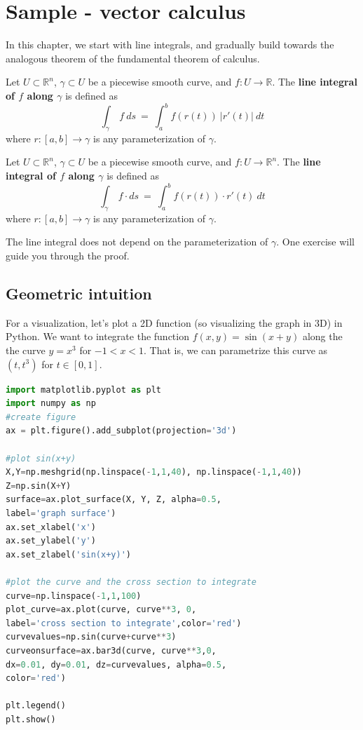 \documentclass[11pt,openany]{book}
\newcommand{\definition}[2]{\begin{tcolorbox}[title=Definition ({#1}),colframe=black]{#2}\end{tcolorbox}
}
\begin{document}
	
	\chapter{Sample - vector calculus}
	
	
	In this chapter, we start with line integrals, and gradually build towards the analogous theorem of the fundamental theorem of calculus.
	
	\definition{Line Integral - scalar}{
		Let $U \subset \mathbb{R}^n$, $\gamma \subset U$ be a piecewise smooth curve, and $f: U \to \mathbb{R}$. The \textbf{line integral of $f$ along $\gamma$} is defined as
		\[
		\int_\gamma \ f \ ds \ = \ \int_a^b f(r(t)) \ |r'(t)| \ dt
		\]
		where $r : [a,b] \to \gamma$ is any parameterization of $\gamma$.
	}
	\definition{Line Integral - vector}{
		Let $U \subset \mathbb{R}^n$, $\gamma \subset U$ be a piecewise smooth curve, and $f: U \to \mathbb{R}^n$. The \textbf{line integral of $f$ along $\gamma$} is defined as
		\[
		\int_\gamma \ f  \cdot ds \ = \ \int_a^b f(r(t)) \cdot r'(t)  \ dt
		\]
		where $r : [a,b] \to \gamma$ is any parameterization of $\gamma$.
	}
	
	The line integral does not depend on the parameterization of $\gamma$. One exercise will guide you through the proof.
	\section*{Geometric intuition}
	For a visualization, let's plot a 2D function (so visualizing the graph in 3D) in Python. We want to integrate the function $f(x,y)=\sin(x+y)$ along the the curve $y=x^3$ for $-1<x<1$. That is, we can parametrize this curve as $(t,t^3)$ for $t\in[0,1]$.
	\begin{lstlisting}[language=Python]
import matplotlib.pyplot as plt
import numpy as np
#create figure
ax = plt.figure().add_subplot(projection='3d')

#plot sin(x+y)
X,Y=np.meshgrid(np.linspace(-1,1,40), np.linspace(-1,1,40))
Z=np.sin(X+Y)
surface=ax.plot_surface(X, Y, Z, alpha=0.5,
label='graph surface')
ax.set_xlabel('x')
ax.set_ylabel('y')
ax.set_zlabel('sin(x+y)')

#plot the curve and the cross section to integrate
curve=np.linspace(-1,1,100)
plot_curve=ax.plot(curve, curve**3, 0,
label='cross section to integrate',color='red')
curvevalues=np.sin(curve+curve**3)
curveonsurface=ax.bar3d(curve, curve**3,0,
dx=0.01, dy=0.01, dz=curvevalues, alpha=0.5,
color='red')

plt.legend()
plt.show()
	\end{lstlisting}
\end{document}
